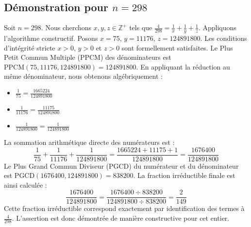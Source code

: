 \documentclass[11pt,a4paper]{article}
\begin{document}
\subsection{Démonstration pour $n = 298$}
Soit $n = 298$. Nous cherchons $x, y, z \in \mathbb{Z}^{+}$ tels que $\frac{4}{298} = \frac{1}{x} + \frac{1}{y} + \frac{1}{z}$.
Appliquons l'algorithme constructif. Posons $x = 75$, $y = 11176$, $z = 124891800$.
Les conditions d'intégrité stricte $x > 0$, $y > 0$ et $z > 0$ sont formellement satisfaites.
Le Plus Petit Commun Multiple (PPCM) des dénominateurs est $\text{PPCM}(75, 11176, 124891800) = 124891800$.
En appliquant la réduction au même dénominateur, nous obtenons algébriquement :
\begin{itemize}
    \item $\frac{1}{75} = \frac{1665224}{124891800}$
    \item $\frac{1}{11176} = \frac{11175}{124891800}$
    \item $\frac{1}{124891800} = \frac{1}{124891800}$
\end{itemize}
La sommation arithmétique directe des numérateurs est :
$$ \frac{1}{75} + \frac{1}{11176} + \frac{1}{124891800} = \frac{1665224 + 11175 + 1}{124891800} = \frac{1676400}{124891800} $$
Le Plus Grand Commun Diviseur (PGCD) du numérateur et du dénominateur est $\text{PGCD}(1676400, 124891800) = 838200$.
La fraction irréductible finale est ainsi calculée :
$$ \frac{1676400}{124891800} = \frac{1676400 \div 838200}{124891800 \div 838200} = \frac{2}{149} $$
Cette fraction irréductible correspond exactement par identification des termes à $\frac{4}{298}$. L'assertion est donc démontrée de manière constructive pour cet entier.
\end{document}
